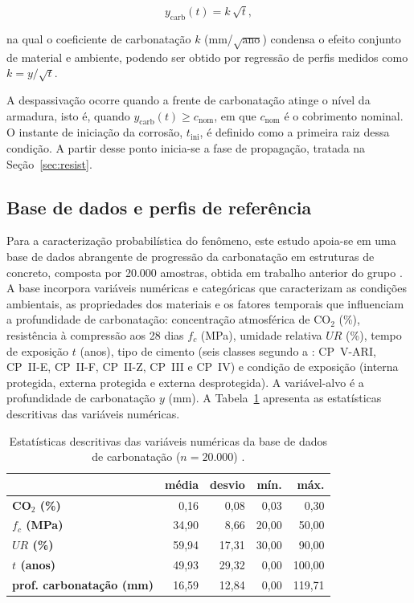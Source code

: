 \begin{equation}\label{eq:raiz_t}
y_{\mathrm{carb}}(t) = k\,\sqrt{t},
\end{equation}

\noindent na qual o coeficiente de carbonatação $k$ (mm/$\sqrt{\text{ano}}$) condensa o efeito conjunto de material e ambiente, podendo ser obtido por regressão de perfis medidos como $k = y/\sqrt{t}$.

A despassivação ocorre quando a frente de carbonatação atinge o nível da armadura, isto é, quando $y_{\mathrm{carb}}(t) \geq c_{\mathrm{nom}}$, em que $c_{\mathrm{nom}}$ é o cobrimento nominal. O instante de iniciação da corrosão, $t_{\mathrm{ini}}$, é definido como a primeira raiz dessa condição. A partir desse ponto inicia-se a fase de propagação, tratada na Seção~\ref{sec:resist}.

\subsection{Base de dados e perfis de referência}
\label{subsec:dataset}

Para a caracterização probabilística do fenômeno, este estudo apoia-se em uma base de dados abrangente de progressão da carbonatação em estruturas de concreto, composta por 20.000 amostras, obtida em trabalho anterior do grupo \citep{couto2025}. A base incorpora variáveis numéricas e categóricas que caracterizam as condições ambientais, as propriedades dos materiais e os fatores temporais que influenciam a profundidade de carbonatação: concentração atmosférica de CO$_2$ (\%), resistência à compressão aos 28 dias $f_c$ (MPa), umidade relativa $UR$ (\%), tempo de exposição $t$ (anos), tipo de cimento (seis classes segundo a \citet{nbr16697}: CP~V-ARI, CP~II-E, CP~II-F, CP~II-Z, CP~III e CP~IV) e condição de exposição (interna protegida, externa protegida e externa desprotegida). A variável-alvo é a profundidade de carbonatação $y$ (mm). A Tabela~\ref{tab:statistics} apresenta as estatísticas descritivas das variáveis numéricas.

\begin{table}[htpb!]
    \centering
    \small
    \caption{Estatísticas descritivas das variáveis numéricas da base de dados de carbonatação ($n = 20.000$) \citep{couto2025}.}
    \label{tab:statistics}
     \begin{tabular}{lrrrr}
    \toprule
     & \textbf{média} & \textbf{desvio} & \textbf{mín.} & \textbf{máx.} \\
    \midrule
    \textbf{CO$_2$ (\%)} & 0,16 & 0,08 & 0,03 & 0,30 \\
    \textbf{$f_c$ (MPa)} & 34,90 & 8,66 & 20,00 & 50,00 \\
    \textbf{$UR$ (\%)} & 59,94 & 17,31 & 30,00 & 90,00 \\
    \textbf{$t$ (anos)} & 49,93 & 29,32 & 0,00 & 100,00 \\
    \textbf{prof. carbonatação (mm)} & 16,59 & 12,84 & 0,00 & 119,71 \\
    \bottomrule
    \end{tabular}
\end{table}

